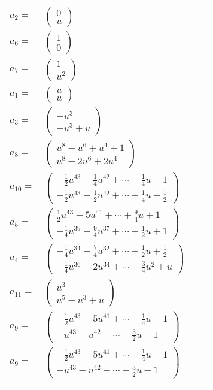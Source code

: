 \documentclass[1p]{elsarticle_modified}
\theoremstyle{definition}
\begin{document}
\begin{tabular}{m{7pt} m{180pt} m{7pt} m{180pt} }
\flushright $a_{2}=$&$\begin{pmatrix}0\\u\end{pmatrix}$ \\
\flushright $a_{6}=$&$\begin{pmatrix}1\\0\end{pmatrix}$ \\
\flushright $a_{7}=$&$\begin{pmatrix}1\\u^2\end{pmatrix}$ \\
\flushright $a_{1}=$&$\begin{pmatrix}u\\u\end{pmatrix}$ \\
\flushright $a_{3}=$&$\begin{pmatrix}- u^3\\- u^3+u\end{pmatrix}$ \\
\flushright $a_{8}=$&$\begin{pmatrix}u^8- u^6+u^4+1\\u^8-2 u^6+2 u^4\end{pmatrix}$ \\
\flushright $a_{10}=$&$\begin{pmatrix}-\frac{1}{2} u^{43}-\frac{1}{4} u^{42}+\cdots-\frac{1}{4} u-1\\-\frac{1}{2} u^{43}-\frac{1}{2} u^{42}+\cdots+\frac{1}{4} u-\frac{1}{2}\end{pmatrix}$ \\
\flushright $a_{5}=$&$\begin{pmatrix}\frac{1}{2} u^{43}-5 u^{41}+\cdots+\frac{9}{4} u+1\\-\frac{1}{4} u^{39}+\frac{9}{4} u^{37}+\cdots+\frac{1}{2} u+1\end{pmatrix}$ \\
\flushright $a_{4}=$&$\begin{pmatrix}-\frac{1}{4} u^{34}+\frac{7}{4} u^{32}+\cdots+\frac{1}{2} u+\frac{1}{2}\\-\frac{1}{4} u^{36}+2 u^{34}+\cdots-\frac{3}{4} u^2+u\end{pmatrix}$ \\
\flushright $a_{11}=$&$\begin{pmatrix}u^3\\u^5- u^3+u\end{pmatrix}$ \\
\flushright $a_{9}=$&$\begin{pmatrix}-\frac{1}{2} u^{43}+5 u^{41}+\cdots-\frac{1}{4} u-1\\- u^{43}- u^{42}+\cdots-\frac{3}{2} u-1\end{pmatrix}$\\ \flushright $a_{9}=$&$\begin{pmatrix}-\frac{1}{2} u^{43}+5 u^{41}+\cdots-\frac{1}{4} u-1\\- u^{43}- u^{42}+\cdots-\frac{3}{2} u-1\end{pmatrix}$\\&\end{tabular}
\end{document}
